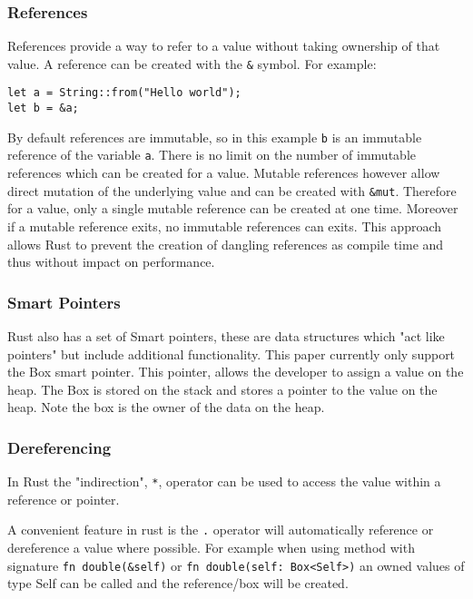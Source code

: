 \documentclass[ oneside,%
                    author={James Elgar},
                    degree={MEng},
                     title={Bidirectional transformer between functional and \\ object-oriented programming in Rust},
                  subtitle={}]{dissertation}
\newcommand{\rust}[1]{\texttt{#1}}
\begin{document}
\subsubsection{References}

References provide a way to refer to a value without taking ownership of that value. A reference can be created with the \rust{&} symbol. For example:

\begin{verbatim}
let a = String::from("Hello world");
let b = &a;
\end{verbatim}

By default references are immutable, so in this example \rust{b} is an immutable reference of the variable \rust{a}.
There is no limit on the number of immutable references which can be created for a value. Mutable references however allow direct mutation of the underlying value and can be created with \rust{&mut}. Therefore for a value, only a single mutable reference can be created at one time. Moreover if a mutable reference exits, no immutable references can exits. This approach allows Rust to prevent the creation of dangling references as compile time and thus without impact on performance.

\subsubsection{Smart Pointers}

Rust also has a set of Smart pointers, these are data structures which "act like pointers" but include additional functionality. This paper currently only support the Box smart pointer. This pointer, allows the developer to assign a value on the heap. The Box is stored on the stack and stores a pointer to the value on the heap. Note the box is the owner of the data on the heap.

\subsubsection{Dereferencing}

In Rust the "indirection", \rust{*}, operator can be used to access the value within a reference or pointer. 

A convenient feature in rust is the \rust{.} operator will automatically reference or dereference a value where possible. For example when using method with signature \rust{fn double(&self)} or \rust{fn double(self: Box<Self>)} an owned values of type Self can be called and the reference/box will be created.
\end{document}
